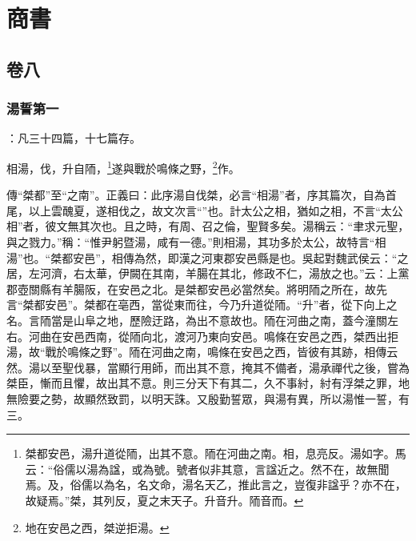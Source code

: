 


\part{商書}


\chapter{卷八}


\section{湯誓第一}


 {\noindent\zhuan{}\fzbyks {}：凡三十四篇，十七篇存。\par}

相湯，伐，升自陑，\footnote{桀都安邑，湯升道從陑，出其不意。陑在河曲之南。相，息亮反。湯如字。馬云：“俗儒以湯為諡，或為號。號者似非其意，言諡近之。然不在，故無聞焉。及，俗儒以為名，名文命，湯名天乙，推此言之，豈復非諡乎？亦不在，故疑焉。”桀，其列反，夏之末天子。升音升。陑音而。}遂與戰於鳴條之野，\footnote{地在安邑之西，桀逆拒湯。}作。


{\noindent\zhuan{}\fzbyks 傳“桀都”至“之南”。正義曰：此序湯自伐桀，必言“相湯”者，序其篇次，自為首尾，以上雲醜夏，遂相伐之，故文次言“”也。計太公之相，猶如之相，不言“太公相”者，彼文無其次也。且之時，有周、召之倫，聖賢多矣。湯稱云：“聿求元聖，與之戮力。”稱：“惟尹躬暨湯，咸有一德。”則相湯，其功多於太公，故特言“相湯”也。“桀都安邑”，相傳為然，即漢之河東郡安邑縣是也。吳起對魏武侯云：“之居，左河濟，右太華，伊闕在其南，羊腸在其北，修政不仁，湯放之也。”云：上黨郡壺關縣有羊腸阪，在安邑之北。是桀都安邑必當然矣。將明陑之所在，故先言“桀都安邑”。桀都在亳西，當從東而往，今乃升道從陑。“升”者，從下向上之名。言陑當是山阜之地，歷險迂路，為出不意故也。陑在河曲之南，蓋今潼關左右。河曲在安邑西南，從陑向北，渡河乃東向安邑。鳴條在安邑之西，桀西出拒湯，故“戰於鳴條之野”。陑在河曲之南，鳴條在安邑之西，皆彼有其跡，相傳云然。湯以至聖伐暴，當顯行用師，而出其不意，掩其不備者，湯承禪代之後，嘗為桀臣，慚而且懼，故出其不意。則三分天下有其二，久不事紂，紂有浮桀之罪，地無險要之勢，故顯然致罰，以明天誅。又殷勤誓眾，與湯有異，所以湯惟一誓，有三。 \par}


